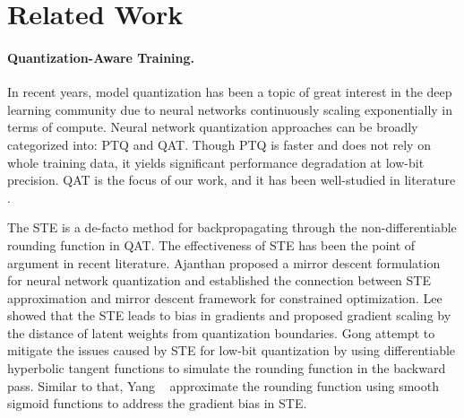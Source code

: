 \section{Related Work}
\paragraph{Quantization-Aware Training.}
In recent years, model quantization has been a topic of great interest in the deep learning community due to neural networks continuously scaling exponentially in terms of compute. Neural network quantization approaches can be broadly categorized into: \acrfull{PTQ} and \acrfull{QAT}. Though \acrshort{PTQ} \cite{dfq, bannerposttraining, nagel2021white, adaround} is faster and does not rely on whole training data, it yields significant performance degradation at low-bit precision. \acrshort{QAT} is the focus of our work, and it has been well-studied in literature \cite{Gong2019DSQ, pact2018, zhou2017incremental, lsq, liu2022nonuniform, EWGS}.

The \acrshort{STE} is a de-facto method for backpropagating through the non-differentiable rounding function in \acrshort{QAT}. The effectiveness of \acrshort{STE} has been the point of argument in recent literature. Ajanthan \etal \cite{pmlr-v130-ajanthan21a} proposed a mirror descent formulation for neural network quantization and established the connection between \acrshort{STE} approximation and mirror descent framework for constrained optimization. Lee \etal~\cite{EWGS} showed that the \acrshort{STE} leads to bias in gradients and proposed gradient scaling by the distance of latent weights from quantization boundaries. Gong \etal \cite{Gong2019DSQ} attempt to mitigate the issues caused by \acrshort{STE} for low-bit quantization by using differentiable hyperbolic tangent functions to simulate the rounding function in the backward pass. Similar to that, Yang \etal~\cite{quantization_nets} approximate the rounding function using smooth sigmoid functions to address the gradient bias in \acrshort{STE}. 

